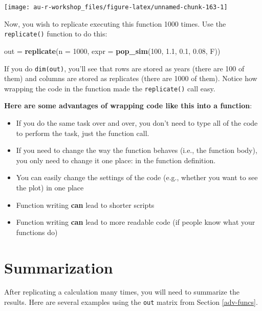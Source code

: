 \documentclass[]{book}
\newenvironment{Shaded}{\begin{snugshade}}{\end{snugshade}}
\newcommand{\KeywordTok}[1]{\textcolor[rgb]{0.13,0.29,0.53}{\textbf{#1}}}
\newcommand{\DataTypeTok}[1]{\textcolor[rgb]{0.13,0.29,0.53}{#1}}
\newcommand{\DecValTok}[1]{\textcolor[rgb]{0.00,0.00,0.81}{#1}}
\newcommand{\FloatTok}[1]{\textcolor[rgb]{0.00,0.00,0.81}{#1}}
\newcommand{\StringTok}[1]{\textcolor[rgb]{0.31,0.60,0.02}{#1}}
\newcommand{\NormalTok}[1]{#1}
\providecommand{\tightlist}{%
  \setlength{\itemsep}{0pt}\setlength{\parskip}{0pt}}
\theoremstyle{definition}
\theoremstyle{definition}
\theoremstyle{definition}
\theoremstyle{remark}
\begin{document}
\begin{center}\texttt{[image: au-r-workshop\_files/figure-latex/unnamed-chunk-163-1]} \end{center}

Now, you wish to replicate executing this function 1000 times. Use the
\texttt{replicate()} function to do this:

\begin{Shaded}
\begin{Highlighting}[]
\NormalTok{out =}\StringTok{ }\KeywordTok{replicate}\NormalTok{(}\DataTypeTok{n =} \DecValTok{1000}\NormalTok{, }\DataTypeTok{expr =} \KeywordTok{pop_sim}\NormalTok{(}\DecValTok{100}\NormalTok{, }\FloatTok{1.1}\NormalTok{, }\FloatTok{0.1}\NormalTok{, }\FloatTok{0.08}\NormalTok{, F))}
\end{Highlighting}
\end{Shaded}

If you do \texttt{dim(out)}, you'll see that rows are stored as years
(there are 100 of them) and columns are stored as replicates (there are
1000 of them). Notice how wrapping the code in the function made the
\texttt{replicate()} call easy.

\textbf{Here are some advantages of wrapping code like this into a
function}:

\begin{itemize}
\tightlist
\item
  If you do the same task over and over, you don't need to type all of
  the code to perform the task, just the function call.
\item
  If you need to change the way the function behaves (i.e., the function
  body), you only need to change it one place: in the function
  definition.
\item
  You can easily change the settings of the code (e.g., whether you want
  to see the plot) in one place
\item
  Function writing \textbf{can} lead to shorter scripts
\item
  Function writing \textbf{can} lead to more readable code (if people
  know what your functions do)
\end{itemize}

\section{Summarization}\label{mc-summaries}

After replicating a calculation many times, you will need to summarize
the results. Here are several examples using the \texttt{out} matrix
from Section \ref{adv-funcs}.
\end{document}
